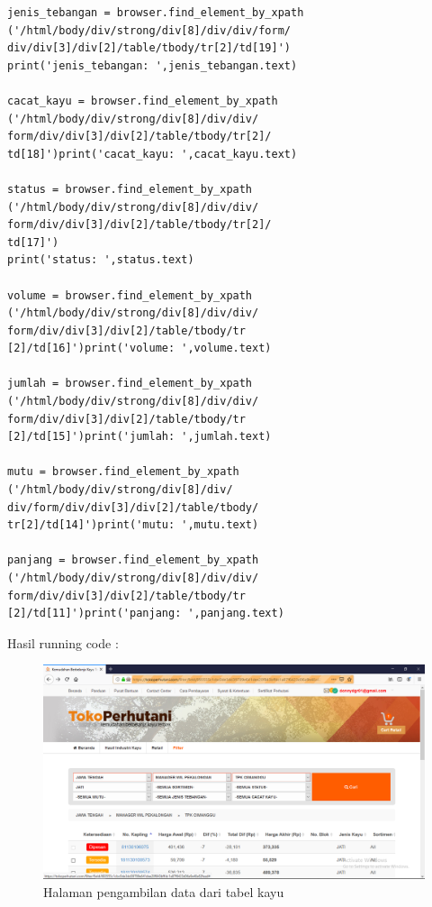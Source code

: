 \begin{verbatim}
jenis_tebangan = browser.find_element_by_xpath
('/html/body/div/strong/div[8]/div/div/form/
div/div[3]/div[2]/table/tbody/tr[2]/td[19]')
print('jenis_tebangan: ',jenis_tebangan.text)

cacat_kayu = browser.find_element_by_xpath
('/html/body/div/strong/div[8]/div/div/
form/div/div[3]/div[2]/table/tbody/tr[2]/
td[18]')print('cacat_kayu: ',cacat_kayu.text)

status = browser.find_element_by_xpath
('/html/body/div/strong/div[8]/div/div/
form/div/div[3]/div[2]/table/tbody/tr[2]/
td[17]')
print('status: ',status.text)

volume = browser.find_element_by_xpath
('/html/body/div/strong/div[8]/div/div/
form/div/div[3]/div[2]/table/tbody/tr
[2]/td[16]')print('volume: ',volume.text)

jumlah = browser.find_element_by_xpath
('/html/body/div/strong/div[8]/div/div/
form/div/div[3]/div[2]/table/tbody/tr
[2]/td[15]')print('jumlah: ',jumlah.text)

mutu = browser.find_element_by_xpath
('/html/body/div/strong/div[8]/div/
div/form/div/div[3]/div[2]/table/tbody/
tr[2]/td[14]')print('mutu: ',mutu.text)

panjang = browser.find_element_by_xpath
('/html/body/div/strong/div[8]/div/div/
form/div/div[3]/div[2]/table/tbody/tr
[2]/td[11]')print('panjang: ',panjang.text)
\end{verbatim}

Hasil running code :
\begin{figure}[h]
	\centering
	\includegraphics[scale=0.25]{figures/781}
	\caption{Halaman pengambilan data dari tabel kayu}
\end{figure}

